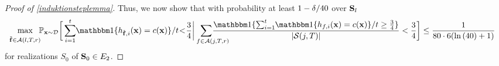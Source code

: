 \begin{proof}[Proof of \cref{induktionsteplemma}]
Thus, we now show that with probability at least $1-\delta/40$ over $ \mathbf{S}_{l} $ 
\begin{align}\label{highprobabilityeq11}
  \max_{\stackrel{}{\rf\in\cA(l,T,r)}}  \negmedspace    &\p_{\rx\sim \cD}
  \bigg[\sum_{i=1}^{t}\negmedspace  \ind\{h_{\rf,i}(\rx)=c(\rx)\}/t\negmedspace <\negmedspace \frac{3}{4}\bigg |
   \negmedspace  \negmedspace \negmedspace  \negmedspace \negmedspace \negmedspace \negmedspace\sum_{\text{\quad\quad}f\in \cA(j,T,r)} \negmedspace \negmedspace \negmedspace \negmedspace\negmedspace \negmedspace  \negmedspace \negmedspace \negmedspace \negmedspace \frac{\ind\{\sum_{i=1}^{t}\negmedspace  \ind\{h_{f,i}(\rx)=c(\rx)\}/t\geq \frac{3}{4}\}}{|\cS(j,T)|}<\frac{3}{4}
  \bigg] \leq \frac{1}{80\cdot6(\ln{(\cnn )}+1)}
\end{align}
for realizations $ S_{0} $ of $\mathbf{S}_{0}\in E_{2}$.


\end{proof}
